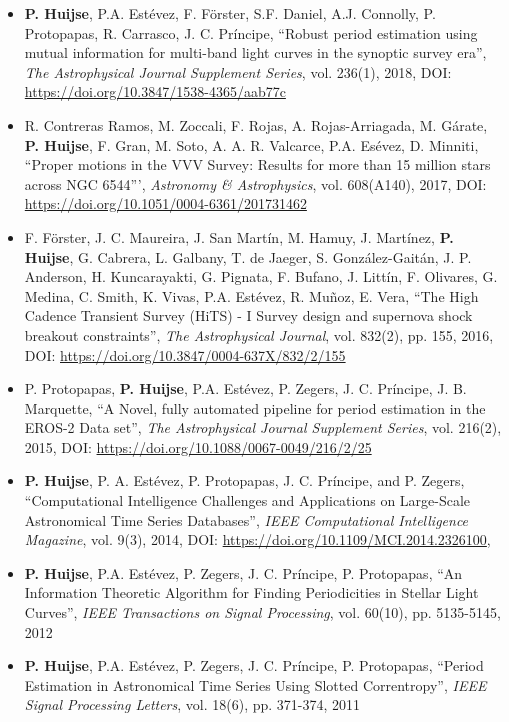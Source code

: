 \documentclass[letterpaper,11pt]{article}
\newcommand{\compactlist}{\setlength{\parskip}{0pt} \setlength{\leftskip}{2em}}
\begin{document}
\begin{enumerate}[I]
	\begin{itemize}  \compactlist{}
        \item \textbf{P. Huijse}, P.A. Est\'evez, F. F\"orster, S.F. Daniel, A.J. Connolly, P. Protopapas, R. Carrasco, J. C. Pr\'incipe, ``Robust period estimation using mutual information for multi-band light curves in the synoptic survey era'', \emph{The Astrophysical Journal Supplement Series}, vol. 236(1), 2018, DOI: \url{https://doi.org/10.3847/1538-4365/aab77c}
        \item  R. Contreras Ramos, M. Zoccali, F. Rojas, A. Rojas-Arriagada, M. G\'arate, \textbf{P. Huijse}, F. Gran, M. Soto, A. A. R. Valcarce, P.A. Es\'evez, D. Minniti, ``Proper motions in the VVV Survey: Results for more than 15 million stars across NGC 6544''', \emph{Astronomy \& Astrophysics}, vol. 608(A140), 2017, DOI: \url{https://doi.org/10.1051/0004-6361/201731462}
        \item F. F\"orster, J. C. Maureira, J. San Mart\'in, M. Hamuy, J. Mart\'inez, \textbf{P. Huijse}, G. Cabrera, L. Galbany, T. de Jaeger, S. González-Gait\'an, J. P. Anderson, H. Kuncarayakti, G. Pignata, F. Bufano, J. Litt\'in, F. Olivares, G. Medina, C. Smith, K. Vivas, P.A. Est\'evez, R. Muñoz, E. Vera, ``The High Cadence Transient Survey (HiTS) - I Survey design and supernova shock breakout constraints'', \emph{The Astrophysical Journal}, vol. 832(2), pp. 155, 2016, DOI: \url{https://doi.org/10.3847/0004-637X/832/2/155}
        \item P. Protopapas, \textbf{P. Huijse}, P.A. Estévez, P. Zegers, J. C. Príncipe, J. B. Marquette, ``A Novel, fully automated pipeline for period estimation in the {EROS}-2 Data set'', \emph{The Astrophysical Journal Supplement Series}, vol. 216(2), 2015, DOI: \url{https://doi.org/10.1088/0067-0049/216/2/25}
        \item \textbf{P. Huijse}, P. A. Estévez, P. Protopapas, J. C. Príncipe, and P. Zegers, ``Computational Intelligence Challenges and Applications on Large-Scale Astronomical Time Series Databases'', \emph{IEEE Computational Intelligence Magazine}, vol. 9(3), 2014, DOI: \url{https://doi.org/10.1109/MCI.2014.2326100}, \href{https://arxiv.org/pdf/1509.07823.pdf}{\faExternalLink}
        \item  \textbf{P. Huijse}, P.A. Estévez, P. Zegers, J. C. Príncipe, P. Protopapas, ``An Information Theoretic Algorithm for Finding Periodicities in Stellar Light Curves'', \emph{IEEE Transactions on Signal Processing}, vol. 60(10), pp. 5135-5145, 2012
        \item \textbf{P. Huijse}, P.A. Estévez, P. Zegers, J. C. Príncipe, P. Protopapas, ``Period Estimation in Astronomical Time Series Using Slotted Correntropy'', \emph{IEEE Signal Processing Letters}, vol. 18(6), pp. 371-374, 2011
	\end{itemize}



\end{enumerate}
\end{document}
